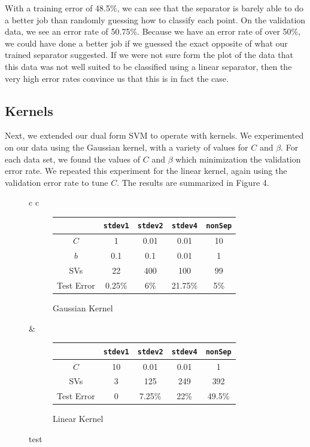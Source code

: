\documentclass{sigchi}
\begin{document}
With a training error of 48.5\%, we can see that the separator is barely able to do a better job than randomly guessing how to classify each point. On the validation data, we see an error rate of 50.75\%. Because we have an error rate of over 50\%, we could have done a better job if we guessed the exact opposite of what our trained separator suggested. If we were not sure form the plot of the data that this data was not well suited to be classified using a linear separator, then the very high error rates convince us that this is in fact the case.

\subsection{Kernels}

Next, we extended our dual form SVM to operate with kernels. We experimented on our data using the Gaussian kernel, with a variety of values for $C$ and $\beta$. For each data set, we found the values of $C$ and $\beta$ which minimization the validation error rate. We repeated this experiment for the linear kernel, again using the validation error rate to tune $C$. The results are summarized in Figure 4.

\begin{figure}
\centering
\renewcommand*{\arraystretch}{1.5}

\begin{tabular}{c c}
\begin{subfigure}[b]{3.5in}
\centering
	\begin{tabular}{| c | c | c | c | c |}
	\hline
	& \texttt{stdev1} & \texttt{stdev2} & \texttt{stdev4} & \texttt{nonSep}\\
	\hline
	$C$ & 1 & 0.01 & 0.01 & 10 \\
	\hline
	$b$ & 0.1 & 0.1 & 0.01 & 1 \\
	\hline
	SVs & 22 & 400 & 100 & 99 \\
	\hline
	Test Error & 0.25\% & 6\% & 21.75\% & 5\% \\
	\hline
	\end{tabular}
	\caption{Gaussian Kernel}
\end{subfigure}
&
\begin{subfigure}[b]{3.5in}
\centering
	\begin{tabular}{| c | c | c | c | c |}
	\hline
	& \texttt{stdev1} & \texttt{stdev2} & \texttt{stdev4} & \texttt{nonSep}\\
	\hline
	$C$ & 10 & 0.01 & 0.01 & 1 \\
	\hline
	SVs & 3 & 125 & 249 & 392 \\
	\hline
	Test Error & 0 & 7.25\% & 22\% & 49.5\%\\
	\hline
	\end{tabular}
	\caption{Linear Kernel}
\end{subfigure}
\end{tabular}

\caption{test}
\end{figure}
\end{document}
